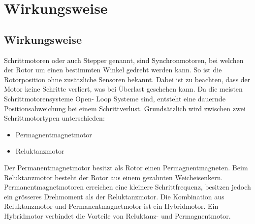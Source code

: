 \ifSTANDALONE
\section{Wirkungsweise} \label{wirkungsweise}
\fi
\ifEMBED
\subsection{Wirkungsweise} \label{wirkungsweise}
\fi

\ifEMBED
    \BLDCcollab
\fi
    
    Schrittmotoren oder auch Stepper genannt, sind Synchronmotoren, bei welchen der Rotor um einen bestimmten Winkel gedreht werden kann. So ist die Rotorposition ohne zusätzliche Sensoren bekannt. Dabei ist zu beachten, dass der Motor keine Schritte verliert, was bei Überlast geschehen kann. Da die meisten Schrittmotorensysteme Open- Loop Systeme sind, entsteht eine dauernde Positionsabweichung bei einem Schrittverlust. Grundsätzlich wird zwischen zwei Schrittmotortypen unterschieden: 
    \begin{itemize}
       	\item Permagnentmagnetmotor
       	\item Reluktanzmotor
    \end{itemize} 
    Der Permanentmagnetmotor besitzt als Rotor einen Permagnentmagneten. Beim Reluktanzmotor besteht der Rotor aus einem gezahnten Weicheisenkern. Permanentmagnetmotoren erreichen eine kleinere Schrittfrequenz, besitzen jedoch ein grösseres Drehmoment als der Reluktanzmotor. Die Kombination aus Reluktanzmotor und Permanentmagnetmotor ist ein Hybridmotor. Ein Hybridmotor verbindet die Vorteile von Reluktanz- und Permagnentmotor.
    
